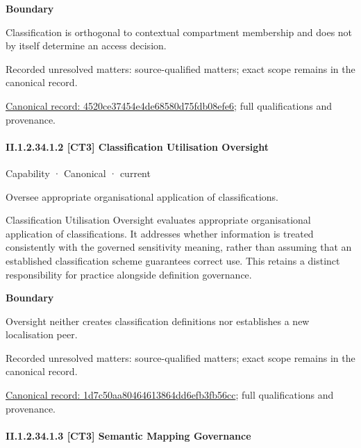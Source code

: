 \textbf{Boundary}



Classification is orthogonal to contextual compartment membership and does not by itself determine an access decision.


{\small Recorded unresolved matters: source-qualified matters; exact scope remains in the canonical record.}\par
{\footnotesize \href{../../../../continuum/strategy/capability/4520ce37454e4de68580d75fdb08efe6.md}{Canonical record: 4520ce37454e4de68580d75fdb08efe6}; full qualifications and provenance.}\par
\paragraph*{II.1.2.34.1.2 [CT3] Classification Utilisation Oversight}
\label{navigation:II.1.2.34.1.2}

\label{element:1d7c50aa80464613864dd6efb3fb56cc}
{\small Capability · Canonical · current}\par

Oversee appropriate organisational application of classifications.



Classification Utilisation Oversight evaluates appropriate organisational application of classifications. It addresses whether information is treated consistently with the governed sensitivity meaning, rather than assuming that an established classification scheme guarantees correct use. This retains a distinct responsibility for practice alongside definition governance.



\textbf{Boundary}



Oversight neither creates classification definitions nor establishes a new localisation peer.


{\small Recorded unresolved matters: source-qualified matters; exact scope remains in the canonical record.}\par
{\footnotesize \href{../../../../continuum/strategy/capability/1d7c50aa80464613864dd6efb3fb56cc.md}{Canonical record: 1d7c50aa80464613864dd6efb3fb56cc}; full qualifications and provenance.}\par
\paragraph*{II.1.2.34.1.3 [CT3] Semantic Mapping Governance}
\label{navigation:II.1.2.34.1.3}

